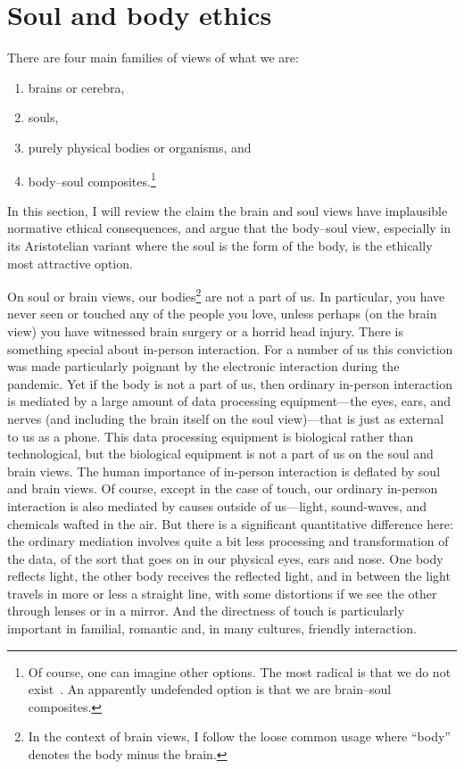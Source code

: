 \section{Soul and body ethics}
There are four main families of views of what we are:
\begin{enumerate}
\item[(i)] brains or cerebra, 
\item[(ii)] souls, 
\item[(iii)] purely physical bodies or organisms, and 
\item[(iv)] body--soul composites.\footnote{Of course, one can imagine other options. The most radical is that we do not 
exist~\parencite{Unger1979}. An apparently undefended option is that we are brain--soul composites.} 
\end{enumerate}
In this section, I will review 
the claim the brain and soul views have implausible normative ethical consequences, and argue that the body--soul view,
especially in its Aristotelian variant where the soul is the form of the body, is the ethically most attractive option.

On soul or brain views, our bodies\footnote{In the context of brain views, I follow the loose common usage
where ``body'' denotes the body minus the brain.} are not a part of us. In particular, you have never seen 
or touched any of the people you love, unless perhaps (on the brain view) you have witnessed brain surgery or 
a horrid head injury. There is something special about in-person interaction. For a number of us 
this conviction was made particularly poignant by the electronic interaction during the pandemic. Yet if the body
is not a part of us, then ordinary in-person interaction is mediated by a large amount of data processing
equipment---the eyes, ears, and nerves (and including the brain itself on the soul view)---that 
is just as external to us as a phone. This data processing equipment is biological rather than technological, but the biological equipment is not a part of us on the soul and brain views. The human importance of in-person interaction
is deflated by soul and brain views. Of course, except in the case of touch, our ordinary in-person interaction is
also mediated by causes outside of us---light, sound-waves, and chemicals wafted in the air. But there is a significant
quantitative difference here: the ordinary mediation involves quite a bit less processing and transformation of the 
data, of the sort that goes on in our physical eyes, ears and nose. One body reflects light, the other body receives
the reflected light, and in between the light travels in more or less a straight line, with some distortions if we
see the other through lenses or in a mirror. And the directness of touch is particularly important in familial,
romantic and, in many cultures, friendly interaction. 

